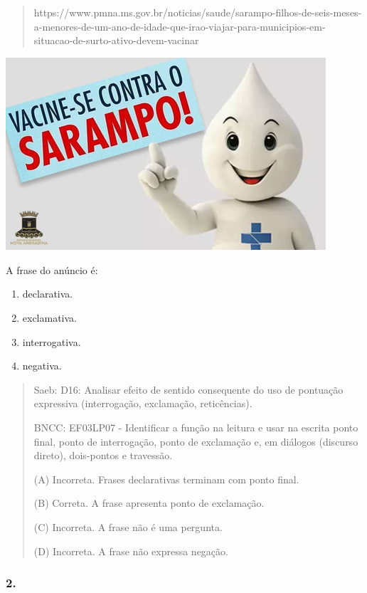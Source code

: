 \begin{quote}
https://www.pmna.ms.gov.br/noticias/saude/sarampo-filhos-de-seis-meses-a-menores-de-um-ano-de-idade-que-irao-viajar-para-municipios-em-situacao-de-surto-ativo-devem-vacinar
\end{quote}

\includegraphics[width=4.68681in,height=2.81736in]{media/image7.jpeg}

A frase do anúncio é:

\begin{enumerate}
\def\labelenumi{(\Alph{enumi})}
\item
  declarativa.
\item
  exclamativa.
\item
  interrogativa.
\item
  negativa.
\end{enumerate}

\begin{quote}
Saeb: D16: Analisar efeito de sentido consequente do uso de pontuação
expressiva (interrogação, exclamação, reticências).

BNCC: EF03LP07 - Identificar a função na leitura e usar na escrita ponto
final, ponto de interrogação, ponto de exclamação e, em diálogos
(discurso direto), dois-pontos e travessão.

(A) Incorreta. Frases declarativas terminam com ponto final.

(B) Correta. A frase apresenta ponto de exclamação.

(C) Incorreta. A frase não é uma pergunta.

(D) Incorreta. A frase não expressa negação.
\end{quote}

\subsubsection{2. }\label{section-37}

